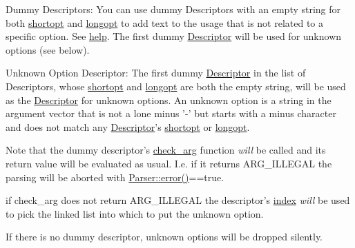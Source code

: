 \begin{DoxyParagraph}{Dummy Descriptors\-:}
You can use dummy Descriptors with an empty string for both \hyperlink{structxmem_1_1config_1_1third__party_1_1_descriptor_ac2dfb6bb8ca2f4aabf964a910cf0d59b}{shortopt} and \hyperlink{structxmem_1_1config_1_1third__party_1_1_descriptor_a7246a4bfc669f68bb406dece398be7bb}{longopt} to add text to the usage that is not related to a specific option. See \hyperlink{structxmem_1_1config_1_1third__party_1_1_descriptor_a099340907003981132a053856dac0eaa}{help}. The first dummy \hyperlink{structxmem_1_1config_1_1third__party_1_1_descriptor}{Descriptor} will be used for unknown options (see below).
\end{DoxyParagraph}
\begin{DoxyParagraph}{Unknown Option Descriptor\-:}
The first dummy \hyperlink{structxmem_1_1config_1_1third__party_1_1_descriptor}{Descriptor} in the list of Descriptors, whose \hyperlink{structxmem_1_1config_1_1third__party_1_1_descriptor_ac2dfb6bb8ca2f4aabf964a910cf0d59b}{shortopt} and \hyperlink{structxmem_1_1config_1_1third__party_1_1_descriptor_a7246a4bfc669f68bb406dece398be7bb}{longopt} are both the empty string, will be used as the \hyperlink{structxmem_1_1config_1_1third__party_1_1_descriptor}{Descriptor} for unknown options. An unknown option is a string in the argument vector that is not a lone minus {\ttfamily '-\/'} but starts with a minus character and does not match any \hyperlink{structxmem_1_1config_1_1third__party_1_1_descriptor}{Descriptor}'s \hyperlink{structxmem_1_1config_1_1third__party_1_1_descriptor_ac2dfb6bb8ca2f4aabf964a910cf0d59b}{shortopt} or \hyperlink{structxmem_1_1config_1_1third__party_1_1_descriptor_a7246a4bfc669f68bb406dece398be7bb}{longopt}. \par
Note that the dummy descriptor's \hyperlink{structxmem_1_1config_1_1third__party_1_1_descriptor_a65b39f8d61de820bb5001d590e7dea5d}{check\-\_\-arg} function {\itshape will} be called and its return value will be evaluated as usual. I.\-e. if it returns A\-R\-G\-\_\-\-I\-L\-L\-E\-G\-A\-L the parsing will be aborted with {\ttfamily \hyperlink{classxmem_1_1config_1_1third__party_1_1_parser_a2c9fddb12fd9e4c735677e831afee138}{Parser\-::error()}==true}. \par
if {\ttfamily check\-\_\-arg} does not return A\-R\-G\-\_\-\-I\-L\-L\-E\-G\-A\-L the descriptor's \hyperlink{structxmem_1_1config_1_1third__party_1_1_descriptor_aacf3d44f35c61f22be65da078f60734b}{index} {\itshape will} be used to pick the linked list into which to put the unknown option. \par
If there is no dummy descriptor, unknown options will be dropped silently. 
\end{DoxyParagraph}
